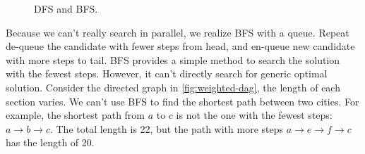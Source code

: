 \documentclass[b5paper]{article}
\begin{document}
\begin{figure}[htbp]
 \centering
 \caption{DFS and BFS.}
 \label{fig:dfs-bfs-tree}
\end{figure}

Because we can't really search in parallel, we realize BFS with a queue. Repeat de-queue the candidate with fewer steps from head, and en-queue new candidate with more steps to tail. BFS provides a simple method to search the solution with the fewest steps. However, it can't directly search for generic optimal solution. Consider the directed graph in \cref{fig:weighted-dag}, the length of each section varies. We can't use BFS to find the shortest path between two cities. For example, the shortest path from $a$ to $c$ is not the one with the fewest steps: $a \to b \to c$. The total length is 22, but the path with more steps $a \to e \to f \to c$ has the length of 20.
\end{document}
